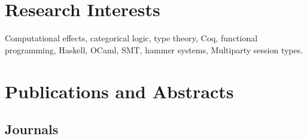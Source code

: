 \documentclass[a4paper,9pt]{article} %
\begin{document}





\section{Research Interests}

Computational effects, categorical logic, type theory, Coq, functional programming, Haskell, OCaml, SMT,
hammer systems, Multiparty session types.

{\vskip4mm}
\section{Publications and Abstracts}
{\vskip1mm}
\subsection*{Journals}
{\vskip1mm}
\end{document}
